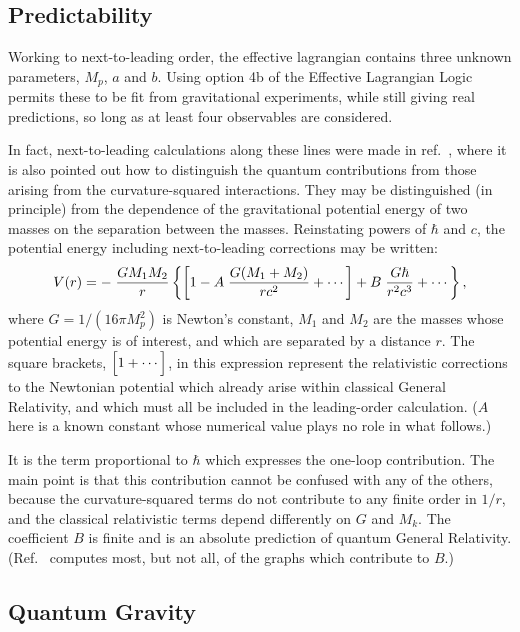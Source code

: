 \subsection{Predictability}

Working to next-to-leading order, the effective lagrangian
contains three unknown parameters, $M_p$, $a$ and $b$.
Using option 4b of the Effective Lagrangian Logic permits
these to be fit from gravitational experiments, while
still giving real predictions, so long as
at least four observables are considered. 

In fact, next-to-leading calculations along these
lines were made in ref.~\cite{DonoghueGR}, 
where it is also pointed out how to distinguish the
quantum contributions from those arising from
the curvature-squared interactions. They may be
distinguished (in principle) from the dependence
of the gravitational potential energy of two masses
on the separation between the masses. Reinstating
powers of $\hbar$ and $c$, the potential energy 
including next-to-leading corrections may be written:
%
\begin{equation}
\label{GRcorr}
V(r) = - \; {G M_1 M_2 \over r} \left\{ \left[ 1 - A \; 
{G(M_1 + M_2) \over r c^2} + \cdots \right]
+ B \; {G \hbar \over r^2 c^3} + \cdots \right\},
\end{equation}
% 
where $G = 1/(16 \pi M_p^2)$ is Newton's constant,
$M_1$ and $M_2$ are the masses whose potential 
energy is of interest, and which are separated by
a distance $r$.
The square brackets, $\Bigl[1 + \cdots \Bigr]$, in this
expression represent the relativistic corrections to the 
Newtonian potential which already arise within classical
General Relativity, and which must all be included
in the leading-order calculation. ($A$ here
is a known constant whose
numerical value plays no role in what follows.) 

It is the term proportional to $\hbar$ which expresses
the one-loop contribution. The main point is that this 
contribution cannot be confused with any of the others,
because the curvature-squared terms do not contribute
to any finite order in $1/r$, and the classical relativistic
terms depend differently on $G$ and $M_k$. The
coefficient $B$ is finite and is an absolute prediction
of quantum General Relativity. (Ref.~\cite{DonoghueGR}
computes most, but not all, of the graphs which 
contribute to $B$.)

\subsection{Quantum Gravity}

